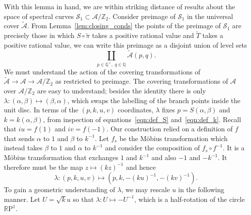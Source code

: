 \documentclass{article}
\numberwithin{equation}{section}
\numberwithin{figure}{section}
\newcommand{\labelthis}[1]{\addtocounter{equation}{1}\tag{\theequation}\label{#1}}
\newcommand{\bra}[1]{\left(#1\right)}
\newcommand{\iu}{i}
\newcommand{\Q}{\mathbb{Q}}
\newcommand{\RP}{\mathbb{R}\text{P}}
\begin{document}
With this lemma in hand, we are within striking distance of results about the space of spectral curves $\mathcal{S}_1 \subset \mathcal{A}/\mathbb{Z}_2$. Consider preimage of $\mathcal{S}_1$ in the universal cover $\mathcal{\tilde{A}}$. From Lemma~\ref{lem:closing_conds} the points of the preimage of $\mathcal{S}_1$ are precisely those in which $S\circ\tilde{\pi}$ takes a positive rational value and $\tilde{T}$ takes a positive rational value, we can write this preimage as a disjoint union of level sets
\[
\coprod_{p\in \Q^+,\; q\in \Q} \mathcal{\tilde{A}}(p,q).
\]
We must understand the action of the covering transformations of $\mathcal{\tilde{A}} \to \mathcal{A} \to \mathcal{A}/\mathbb{Z}_2$ as restricted to preimage. The covering transformations of $\mathcal{A}$ over $\mathcal{A}/\mathbb{Z}_2$ are easy to understand; besides the identity there is only $\lambda : (\alpha,\beta) \mapsto (\beta,\alpha)$, which swaps the labelling of the branch points inside the unit disc. 
In terms of the $(p,k,u,v)$ coordinates, $\lambda$ fixes $p = S(\alpha,\beta)$ and $k = k(\alpha,\beta)$, from inspection of equations~\eqref{eqn:def_S} and~\eqref{eqn:def_k}. Recall that $\iu u = f(1)$ and $\iu v = f(-1)$. Our construction relied on a definition of $f$ that sends $\alpha$ to $1$ and $\beta$ to $k^{-1}$. Let $f_s$ be the M\"obius transformation which instead takes $\beta$ to $1$ and $\alpha$ to $k^{-1}$ and consider the composition of $f_s \circ f^{-1}$. It is a M\"obius transformation that exchanges $1$ and $k^{-1}$ and also $-1$ and $-k^{-1}$. It therefore must be the map $z \mapsto (kz)^{-1}$ and hence
\[
\lambda: (p,k,u,v) \mapsto \bra{ p,k, -(ku)^{-1}, -(kv)^{-1} }.
\]
To gain a geometric understanding of $\lambda$, we may rescale $u$ in the following manner. Let $U=\sqrt{k} u$ so that $\lambda: U \mapsto -U^{-1}$,
which is a half-rotation of the circle $\RP^1$.

\end{document}
